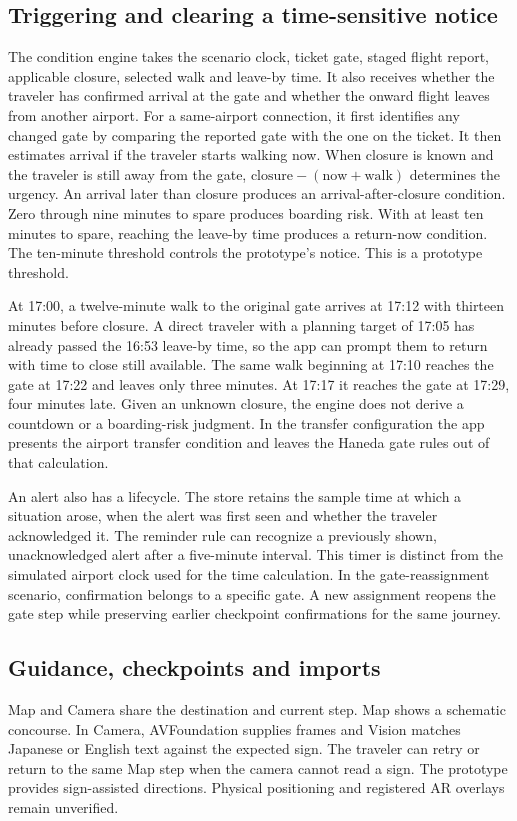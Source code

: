 \documentclass[sigconf,nonacm,balance=false]{acmart}
\begin{document}
\subsection{Triggering and clearing a time-sensitive notice}
The condition engine takes the scenario clock, ticket gate, staged flight report, applicable closure, selected walk and leave-by time. It also receives whether the traveler has confirmed arrival at the gate and whether the onward flight leaves from another airport. For a same-airport connection, it first identifies any changed gate by comparing the reported gate with the one on the ticket. It then estimates arrival if the traveler starts walking now. When closure is known and the traveler is still away from the gate, $\text{closure}-(\text{now}+\text{walk})$ determines the urgency. An arrival later than closure produces an arrival-after-closure condition. Zero through nine minutes to spare produces boarding risk. With at least ten minutes to spare, reaching the leave-by time produces a return-now condition. The ten-minute threshold controls the prototype's notice. This is a prototype threshold.

At 17:00, a twelve-minute walk to the original gate arrives at 17:12 with thirteen minutes before closure. A direct traveler with a planning target of 17:05 has already passed the 16:53 leave-by time, so the app can prompt them to return with time to close still available. The same walk beginning at 17:10 reaches the gate at 17:22 and leaves only three minutes. At 17:17 it reaches the gate at 17:29, four minutes late. Given an unknown closure, the engine does not derive a countdown or a boarding-risk judgment. In the transfer configuration the app presents the airport transfer condition and leaves the Haneda gate rules out of that calculation.

An alert also has a lifecycle. The store retains the sample time at which a situation arose, when the alert was first seen and whether the traveler acknowledged it. The reminder rule can recognize a previously shown, unacknowledged alert after a five-minute interval. This timer is distinct from the simulated airport clock used for the time calculation. In the gate-reassignment scenario, confirmation belongs to a specific gate. A new assignment reopens the gate step while preserving earlier checkpoint confirmations for the same journey.

\subsection{Guidance, checkpoints and imports}
Map and Camera share the destination and current step. Map shows a schematic concourse. In Camera, AVFoundation supplies frames and Vision matches Japanese or English text against the expected sign. The traveler can retry or return to the same Map step when the camera cannot read a sign. The prototype provides sign-assisted directions. Physical positioning and registered AR overlays remain unverified.
\end{document}
